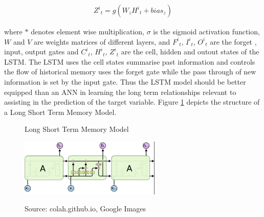 \documentclass[11pt]{article}
\begin{document}
\begin{align}
{Z^{i}}_{t} = g(W_{z}{H^{i}}_{t} + bias_{z})
\end{align}

where $*$ denotes element wise multiplication, $\sigma$ is the sigmoid activation function, $W$ and $V$ are weights matrices of different layers, and ${F^{i}}_{t}$, ${I^{i}}_{t}$, ${O^{i}}_{t}$ are the forget , input, output gates and ${C^{i}}_{t} $, ${H^{i}}_{t}$, ${Z^{i}}_{t}$ are the cell,  hidden and outout states of the LSTM. The LSTM uses the cell states summarise past information and controls the flow of historical memory uses the forget gate while the pass through of new information is set by the input gate. Thus the LSTM model should be better equipped than an ANN in learning the long term relationships relevant to assisting in the prediction of the target variable. Figure \ref{fig:LSTM_arch} depicts the structure of a Long Short Term Memory Model. 

\begin{figure}[h]
    \centering
	\caption{Long Short Term Memory Model}    
	\includegraphics[width=0.6\textwidth]{LSTM_arch}
    \label{fig:LSTM_arch}
     \caption*{\small Source: colah.github.io, Google Images}
\end{figure}
 
\end{document}
